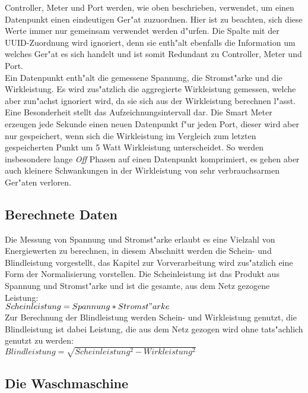 Controller, Meter und Port werden, wie oben beschrieben, verwendet, um einen Datenpunkt einen eindeutigen Ger"at zuzuordnen. Hier ist zu beachten, sich diese Werte immer nur gemeinsam verwendet werden d"urfen.
Die Spalte mit der UUID-Zuordnung wird ignoriert, denn sie enth"alt ebenfalls die Information um welches Ger"at es sich handelt und ist somit Redundant zu Controller, Meter und Port. \\
Ein Datenpunkt enth"alt die gemessene Spannung, die Stromst"arke und die Wirkleistung. Es wird zus"atzlich die aggregierte Wirkleistung gemessen, welche aber zun"achst ignoriert wird, da sie sich aus der Wirkleistung berechnen l"asst. \\
Eine Besonderheit stellt das Aufzeichnungsintervall dar. Die Smart Meter erzeugen jede Sekunde einen neuen Datenpunkt f"ur jeden Port, dieser wird aber nur gespeichert, wenn sich die Wirkleistung im Vergleich zum letzten gespeicherten Punkt um 5 Watt Wirkleistung unterscheidet. So werden insbesondere lange \textit{Off} Phasen auf einen Datenpunkt komprimiert, es gehen aber auch kleinere Schwankungen in der Wirkleistung von sehr verbrauchsarmen Ger"aten verloren.


\subsection{Berechnete Daten}
\label{Berechnete Daten}

Die Messung von Spannung und Stromst"arke erlaubt es eine Vielzahl von Energiewerten zu berechnen, in diesem Abschnitt werden die Schein- und Blindleistung vorgestellt, das Kapitel zur Vorverarbeitung wird zus"atzlich eine Form der Normalisierung vorstellen. 
Die Scheinleistung ist das Produkt aus Spannung und Stromst"arke und ist die gesamte, aus dem Netz gezogene Leistung:\\ $Scheinleistung = Spannung * Stromst"arke$\\[0.5cm]
Zur Berechnung der Blindleistung werden Schein- und Wirkleistung genutzt, die Blindleistung ist dabei Leistung, die aus dem Netz gezogen wird ohne tats"achlich genutzt zu werden:\\ $Blindleistung = \sqrt{Scheinleistung^2 - Wirkleistung^2}$ \\


\subsection{Die Waschmaschine}
\label{Die Waschmaschine}

